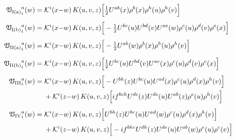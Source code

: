 \begin{align}
{\mathfrak V_{\rm I(a)}}^{a}_{i}(w)=\;&\mathcal{K}^{i}(x{-}w)\,K(u,v,z)\Big[\tfrac{1}{2}U^{ab}(x)\rho^{b}(x)\rho^{h}(u)\rho^{h}(v)\Big]\label{eq:LLP1PI_Nafter}
\\[4pt]
{\mathfrak V_{\rm I(b)}}^{a}_{i}(w)=\;&\mathcal{K}^{i}(x{-}w)\,K(u,v,z)\Big[-\tfrac{1}{2}U^{bc}(u)U^{bd}(v)U^{ae}(w)\rho^{c}(u)\rho^{d}(v)\rho^{e}(x)\Big]\label{eq:LLP1PI_Nbarbefore}
\\[4pt]
{\mathfrak V_{\rm II(a)}}^{a}_{i}(w)=\;&\mathcal{K}^{i}(x{-}w)\,K(u,v,z)\Big[-\tfrac{1}{2}U^{ab}(w)\rho^{b}(x)\rho^{h}(u)\rho^{h}(v)\Big]\label{eq:LLP1PII_A3}
\\[4pt]
{\mathfrak V_{\rm II(b)}}^{a}_{i}(w)=\;&\mathcal{K}^{i}(x{-}w)\,K(u,v,z)\Big[\tfrac{1}{2}U^{bc}(u)U^{bd}(v)U^{ae}(x)\rho^{c}(u)\rho^{d}(v)\rho^{e}(x)\Big]\label{eq:LLP1PII_A3bar}
\\[4pt]
{\mathfrak V_{\rm III}}^{a}_{i}(w)=\;&\mathcal{K}^{i}(x{-}w)\,K(u,v,z)\Big[-U^{bh}(z)U^{bc}(u)U^{ad}(x)\rho^{c}(u)\rho^{d}(x)\rho^{h}(v)\Big]\notag\\
&+\mathcal{K}^{i}(z{-}w)\,K(u,v,z)\Big[if^{bch}U^{dc}(z)U^{de}(u)U^{ab}(z)\rho^{e}(u)\rho^{h}(v)\Big]\label{eq:LLP1PIII}
\\[4pt]
{\mathfrak V_{\rm IV}}^{a}_{i}(w)=\;&\mathcal{K}^{i}(x{-}w)\,K(u,v,z)\Big[U^{bh}(z)U^{bc}(u)U^{ad}(w)\rho^{c}(u)\rho^{d}(x)\rho^{h}(v)\Big]\notag\\
&+\mathcal{K}^{i}(z{-}w)\,K(u,v,z)\Big[-if^{bhc}U^{dh}(z)U^{de}(u)U^{ab}(w)\rho^{e}(u)\rho^{c}(v)\Big]\label{eq:LLP1PIV}
\end{align}
